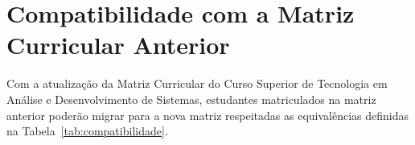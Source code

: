 \documentclass[
	10pt,				%
	openright,			%
	twoside,			%
	a4paper,			%
	english,			%
	french,				%
	brazil,				%
	sumario=tradicional
]{abntex2}
\begin{document}
\section*{Compatibilidade com a Matriz Curricular Anterior}
\indent

Com a atualização da Matriz Curricular do Curso Superior de Tecnologia em Análise e Desenvolvimento de Sistemas, estudantes matriculados na matriz anterior poderão migrar para a nova matriz respeitadas as equivalências definidas na Tabela~\ref{tab:compatibilidade}.


\begin{table}[]
	\centering
	\caption{Tabela de equivalência de disciplinas entre a Matriz Curricular de 2014 e a Matriz Vigente.}
	\label{tab:compatibilidade}
\end{table}
\end{document}
